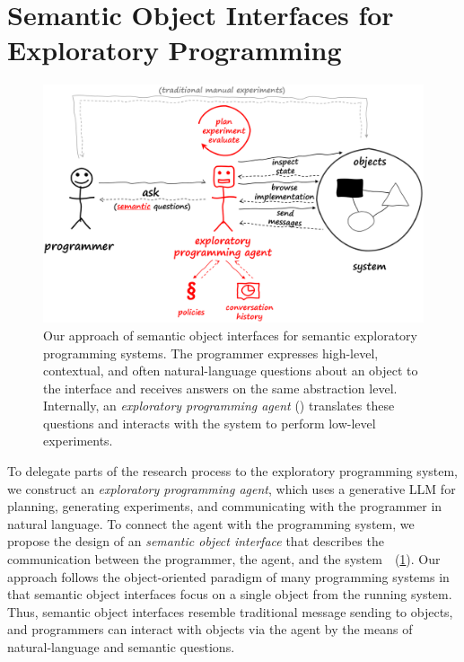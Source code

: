 
\section{Semantic Object Interfaces for Exploratory Programming}
\label{sec:design/agent}

\begin{figure}
	\centering
	\includegraphics[width=.9\textwidth]{03_agent/framework.png}
	\caption[Our approach of \emph{semantic object interfaces} for semantic exploratory programming systems.]{
		Our approach of semantic object interfaces for semantic exploratory programming systems.
		The programmer expresses high-level, contextual, and often natural-language questions about an object to the interface and receives answers on the same abstraction level.
		Internally, an \emph{exploratory programming agent} (\bold{\textcolor{red}{red}}) translates these questions and interacts with the system to perform low-level experiments.
	}
	\label{fig:design/agent/framework}
\end{figure}

To delegate parts of the research process to the exploratory programming system, we construct an \emph{exploratory programming agent}, which uses a generative LLM for planning, generating experiments, and communicating with the programmer in natural language.
To connect the agent with the programming system, we propose the design of an \emph{semantic object interface} that describes the communication between the programmer, the agent, and the system~\cite{thiede2024talking}~(\cref{fig:design/agent/framework}).
Our approach follows the object-oriented paradigm of many programming systems in that semantic object interfaces focus on a single object from the running system.
Thus, semantic object interfaces resemble traditional message sending to objects, and programmers can interact with objects via the agent by the means of natural-language and semantic questions.

